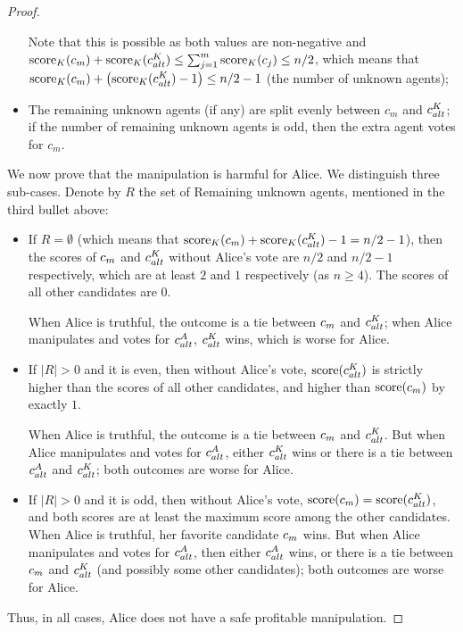\begin{proof}
\begin{itemize}
Note that 
this is possible as both values are non-negative and $\operatorname{score}_K(c_m) + \operatorname{score}_K(c^K_{alt}) \leq \sum_{j =1}^m \operatorname{score}_K(c_j) \leq  n/2$,
which means that $\operatorname{score}_K(c_m) + \left(\operatorname{score}_K(c^K_{alt})-1\right) \leq n/2-1$ (the number of unknown agents);
\item 
The remaining unknown agents (if any) are split evenly between $c_m$ and $c^K_{alt}$; if the number of remaining unknown agents is odd, then the extra agent votes for $c_m$.
\end{itemize}
We now prove that the manipulation is harmful for Alice. We distinguish three sub-cases. Denote by $R$ the set of Remaining unknown agents, mentioned in the third bullet above:
\begin{itemize}
\item If $R=\emptyset$
(which means that $\operatorname{score}_K(c_m) + \operatorname{score}_K(c^K_{alt}) -1 = n/2 -1$),
then
the scores of $c_m$ and $c^K_{alt}$ without Alice's vote are $n/2$ and $n/2-1$ respectively, which are at least $2$ and $1$ respectively (as $n\geq 4$).
The scores of all other candidates are $0$.

When Alice is truthful, the outcome is a tie between $c_m$ and $c^K_{alt}$;
when Alice manipulates and votes for $c^A_{alt}$, $c^K_{alt}$ wins, which is worse for Alice.



\item If $|R|>0$ and it is even,
then without Alice's vote, 
$\operatorname{score}(c^K_{alt})$ is strictly higher than the scores of all other candidates, and higher than $\operatorname{score}(c_m)$ by exactly $1$.

When Alice is truthful, the outcome is a tie between $c_m$ and $c^K_{alt}$.
But when Alice manipulates and votes for $c^A_{alt}$, 
either $c^K_{alt}$ wins or there is a tie between $c^A_{alt}$ and $c^K_{alt}$; both outcomes are worse for Alice.

\item If $|R|>0$ and it is odd, 
then without Alice's vote, $\operatorname{score}(c_m) = \operatorname{score}(c^K_{alt})$, and both scores are at least the maximum score among the other candidates.
When Alice is truthful, her favorite candidate $c_m$ wins. 
But when Alice manipulates and votes for $c^A_{alt}$,
then either $c^A_{alt}$ wins, or there is a tie between $c_m$ and $c^K_{alt}$ (and possibly some other candidates); both outcomes are worse for Alice.
\end{itemize}
Thus, in all cases, Alice does not have a safe profitable manipulation.
\end{proof}


